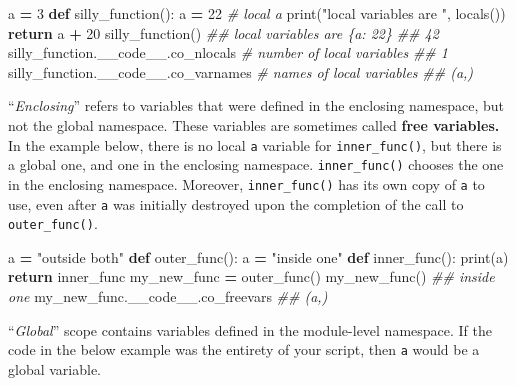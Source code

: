 \documentclass[
  12pt,
]{krantz}
\makeatletter
\newenvironment{Shaded}{\begin{snugshade}}{\end{snugshade}}
\newcommand{\BuiltInTok}[1]{#1}
\newcommand{\CommentTok}[1]{\textcolor[rgb]{0.37,0.37,0.37}{\textit{#1}}}
\newcommand{\ControlFlowTok}[1]{\textcolor[rgb]{0.27,0.27,0.27}{\textbf{#1}}}
\newcommand{\DecValTok}[1]{\textcolor[rgb]{0.06,0.06,0.06}{#1}}
\newcommand{\KeywordTok}[1]{\textcolor[rgb]{0.27,0.27,0.27}{\textbf{#1}}}
\newcommand{\NormalTok}[1]{#1}
\newcommand{\OperatorTok}[1]{\textcolor[rgb]{0.43,0.43,0.43}{\textbf{#1}}}
\newcommand{\StringTok}[1]{\textcolor[rgb]{0.5,0.5,0.5}{#1}}
\newenvironment{kframe}{%
\medskip{}
\setlength{\fboxsep}{.8em}
 \def\at@end@of@kframe{}%
 \ifinner\ifhmode%
  \def\at@end@of@kframe{\end{minipage}}%
  \begin{minipage}{\columnwidth}%
 \fi\fi%
 \def\FrameCommand##1{\hskip\@totalleftmargin \hskip-\fboxsep
 \colorbox{shadecolor}{##1}\hskip-\fboxsep
     \hskip-\linewidth \hskip-\@totalleftmargin \hskip\columnwidth}%
 \MakeFramed {\advance\hsize-\width
   \@totalleftmargin\z@ \linewidth\hsize
   \@setminipage}}%
 {\par\unskip\endMakeFramed%
 \at@end@of@kframe}
\renewenvironment{Shaded}{\begin{kframe}}{\end{kframe}}
\makeatother
\begin{document}
\begin{Shaded}
\begin{Highlighting}[]
\NormalTok{a }\OperatorTok{=} \DecValTok{3}
\KeywordTok{def}\NormalTok{ silly\_function():}
\NormalTok{  a }\OperatorTok{=} \DecValTok{22} \CommentTok{\# local a}
  \BuiltInTok{print}\NormalTok{(}\StringTok{"local variables are "}\NormalTok{, }\BuiltInTok{locals}\NormalTok{())}
  \ControlFlowTok{return}\NormalTok{ a }\OperatorTok{+} \DecValTok{20}
\NormalTok{silly\_function()}
\CommentTok{\#\# local variables are  \{\textquotesingle{}a\textquotesingle{}: 22\}}
\CommentTok{\#\# 42}
\NormalTok{silly\_function.\_\_code\_\_.co\_nlocals }\CommentTok{\# number of local variables}
\CommentTok{\#\# 1}
\NormalTok{silly\_function.\_\_code\_\_.co\_varnames }\CommentTok{\# names of local variables}
\CommentTok{\#\# (\textquotesingle{}a\textquotesingle{},)}
\end{Highlighting}
\end{Shaded}

``\emph{Enclosing}'' refers to variables that were defined in the enclosing namespace, but not the global namespace. These variables are sometimes called \textbf{free variables.} In the example below, there is no local \texttt{a} variable for \texttt{inner\_func()}, but there is a global one, and one in the enclosing namespace. \texttt{inner\_func()} chooses the one in the enclosing namespace. Moreover, \texttt{inner\_func()} has its own copy of \texttt{a} to use, even after \texttt{a} was initially destroyed upon the completion of the call to \texttt{outer\_func()}.

\begin{Shaded}
\begin{Highlighting}[]
\NormalTok{a }\OperatorTok{=} \StringTok{"outside both"}
\KeywordTok{def}\NormalTok{ outer\_func():}
\NormalTok{  a }\OperatorTok{=} \StringTok{"inside one"}
  \KeywordTok{def}\NormalTok{ inner\_func():}
    \BuiltInTok{print}\NormalTok{(a)}
  \ControlFlowTok{return}\NormalTok{ inner\_func}
\NormalTok{my\_new\_func }\OperatorTok{=}\NormalTok{ outer\_func()}
\NormalTok{my\_new\_func()}
\CommentTok{\#\# inside one}
\NormalTok{my\_new\_func.\_\_code\_\_.co\_freevars}
\CommentTok{\#\# (\textquotesingle{}a\textquotesingle{},)}
\end{Highlighting}
\end{Shaded}

``\emph{Global}'' scope contains variables defined in the module-level namespace. If the code in the below example was the entirety of your script, then \texttt{a} would be a global variable.
\end{document}
